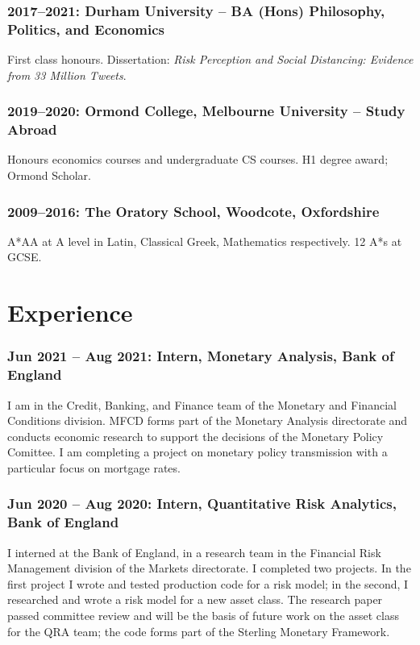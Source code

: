 \documentclass[a4]{article}
\begin{document}
\subsubsection*{2017--2021: Durham University -- BA (Hons) Philosophy, Politics, and Economics}
First class honours. Dissertation: \textit{Risk Perception and Social Distancing: Evidence from 33 Million Tweets}.%
\subsubsection*{2019--2020: Ormond College, Melbourne University -- Study Abroad}
Honours economics courses and undergraduate CS courses. H1 degree award; Ormond Scholar.

\subsubsection*{2009--2016: The Oratory School, Woodcote, Oxfordshire}
A*AA at A level in Latin, Classical Greek, Mathematics respectively. 12 A*s at GCSE.
  
\section*{Experience}
\subsubsection*{Jun 2021 -- Aug 2021: Intern, Monetary Analysis, Bank of England}
I am in the Credit, Banking, and Finance team of the Monetary and Financial Conditions division. MFCD forms part of the Monetary Analysis directorate and conducts economic research to support the decisions of the Monetary Policy Comittee. I am completing a project on monetary policy transmission with a particular focus on mortgage rates.

\subsubsection*{Jun 2020 -- Aug 2020: Intern, Quantitative Risk Analytics, Bank of England}
I interned at the Bank of England, in a research team in the Financial Risk Management division of the Markets directorate. I completed two projects. In the first project I wrote and tested production code for a risk model; in the second, I researched and wrote a risk model for a new asset class. The research paper passed committee review and will be the basis of future work on the asset class for the QRA team; the code forms part of the Sterling Monetary Framework. 
\end{document}

